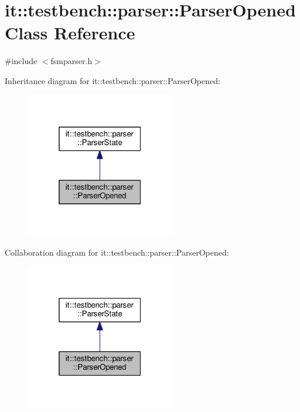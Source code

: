 \hypertarget{classit_1_1testbench_1_1parser_1_1ParserOpened}{\section{it\-:\-:testbench\-:\-:parser\-:\-:Parser\-Opened Class Reference}
\label{d3/d26/classit_1_1testbench_1_1parser_1_1ParserOpened}
}


{\ttfamily \#include $<$fsmparser.\-h$>$}



Inheritance diagram for it\-:\-:testbench\-:\-:parser\-:\-:Parser\-Opened\-:
\nopagebreak
\begin{figure}[H]
\begin{center}
\leavevmode
\includegraphics[width=184pt]{df/d85/classit_1_1testbench_1_1parser_1_1ParserOpened__inherit__graph}
\end{center}
\end{figure}


Collaboration diagram for it\-:\-:testbench\-:\-:parser\-:\-:Parser\-Opened\-:
\nopagebreak
\begin{figure}[H]
\begin{center}
\leavevmode
\includegraphics[width=184pt]{de/d18/classit_1_1testbench_1_1parser_1_1ParserOpened__coll__graph}
\end{center}
\end{figure}
